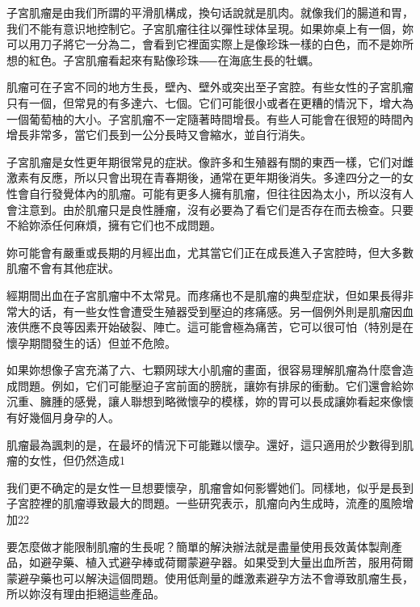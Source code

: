 \documentclass[12pt,UTF8]{ctexbook}
\begin{document}
子宮肌瘤是由我们所謂的平滑肌構成，換句话說就是肌肉。就像我们的腸道和胃，我们不能有意识地控制它。子宮肌瘤往往以彈性球体呈現。如果妳桌上有一個，妳可以用刀子將它一分為二，會看到它裡面实際上是像珍珠一樣的白色，而不是妳所想的紅色。子宮肌瘤看起來有點像珍珠⸺在海底生長的牡蠣。

肌瘤可在子宮不同的地方生長，壁內、壁外或突出至子宮腔。有些女性的子宮肌瘤只有一個，但常見的有多達六、七個。它们可能很小或者在更糟的情況下，增大為一個葡萄柚的大小。子宮肌瘤不一定隨著時間增長。有些人可能會在很短的時間內增長非常多，當它们長到一公分長時又會縮水，並自行消失。

子宮肌瘤是女性更年期很常見的症狀。像許多和生殖器有關的東西一樣，它们对雌激素有反應，所以只會出現在青春期後，通常在更年期後消失。多達四分之一的女性會自行發覺体內的肌瘤。可能有更多人擁有肌瘤，但往往因為太小，所以沒有人會注意到。由於肌瘤只是良性腫瘤，沒有必要為了看它们是否存在而去檢查。只要不給妳添任何麻煩，擁有它们也不成問題。

妳可能會有嚴重或長期的月經出血，尤其當它们正在成長進入子宮腔時，但大多數肌瘤不會有其他症狀。

經期間出血在子宮肌瘤中不太常見。而疼痛也不是肌瘤的典型症狀，但如果長得非常大的话，有一些女性會遭受生殖器受到壓迫的疼痛感。另一個例外則是肌瘤因血液供應不良等因素开始破裂、陣亡。這可能會極為痛苦，它可以很可怕（特別是在懷孕期間發生的话）但並不危險。

如果妳想像子宮充滿了六、七顆网球大小肌瘤的畫面，很容易理解肌瘤為什麼會造成問題。例如，它们可能壓迫子宮前面的膀胱，讓妳有排尿的衝動。它们還會給妳沉重、臃腫的感覺，讓人聯想到略微懷孕的模樣，妳的胃可以長成讓妳看起來像懷有好幾個月身孕的人。

肌瘤最為諷刺的是，在最坏的情況下可能難以懷孕。還好，這只適用於少數得到肌瘤的女性，但仍然造成1%

我们更不确定的是女性一旦想要懷孕，肌瘤會如何影響她们。同樣地，似乎是長到子宮腔裡的肌瘤導致最大的問題。一些研究表示，肌瘤向內生成時，流產的風險增加22%

要怎麼做才能限制肌瘤的生長呢？簡單的解決辦法就是盡量使用長效黃体製劑產品，如避孕藥、植入式避孕棒或荷爾蒙避孕器。如果受到大量出血所苦，服用荷爾蒙避孕藥也可以解決這個問題。使用低劑量的雌激素避孕方法不會導致肌瘤生長，所以妳沒有理由拒絕這些產品。
\end{document}
